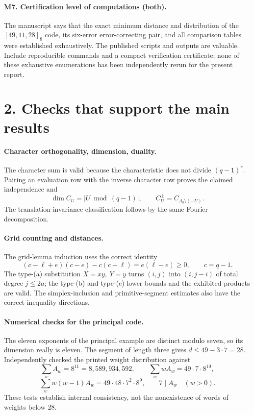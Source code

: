 \documentclass[12pt,letterpaper]{article}
\begin{document}
\paragraph{M7. Certification level of computations (both).}
The manuscript says that the exact minimum distance and distribution of the \([49,11,28]_8\) code, its six-error error-correcting pair, and all comparison tables were established exhaustively. The published scripts and outputs are valuable. Include reproducible commands and a compact verification certificate; none of these exhaustive enumerations has been independently rerun for the present report.

\section*{2. Checks that support the main results}

\paragraph{Character orthogonality, dimension, duality.}
The character sum is valid because the characteristic does not divide \((q-1)^r\). Pairing an evaluation row with the inverse character row proves the claimed independence and
\[
 \dim C_U = |U\bmod(q-1)|,\qquad
 C_U^\perp=C_{\Lambda_q\setminus(-U)}.
\]
The translation-invariance classification follows by the same Fourier decomposition.

\paragraph{Grid counting and distances.}
The grid-lemma induction uses the correct identity
\[
(c-\ell+e)(c-e)-c(c-\ell)=e(\ell-e)\ge0,
 \qquad c=q-1 .
\]
The type-(a) substitution \(X=xy,\ Y=y\) turns \((i,j)\) into \((i,j-i)\) of total degree \(j\le2a\); the type-(b) and type-(c) lower bounds and the exhibited products are valid. The simplex-inclusion and primitive-segment estimates also have the correct inequality directions.

\paragraph{Numerical checks for the principal code.}
The eleven exponents of the principal example are distinct modulo seven, so its dimension really is eleven. The segment of length three gives
\(d\le49-3\cdot7=28\). Independently checked the printed weight distribution against
\[
\sum_w A_w=8^{11}=8{,}589{,}934{,}592,\qquad
\sum_w wA_w=49\cdot7\cdot8^{10},
\]
\[
\sum_w w(w-1)A_w=49\cdot48\cdot7^2\cdot8^9,
\qquad 7\mid A_w \quad(w>0).
\]
These tests establish internal consistency, not the nonexistence of words of weights below 28.
\end{document}

